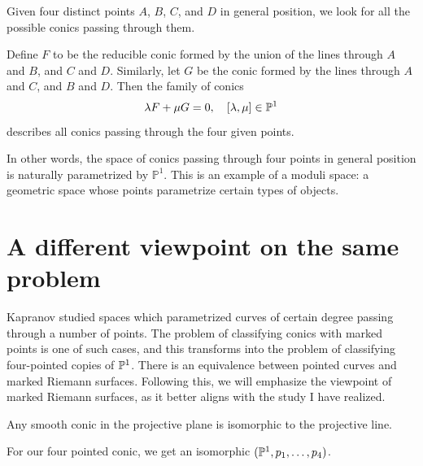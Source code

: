 \documentclass[12pt]{memoir}
\begin{document}
\begin{Ex}
    Given four distinct points $A$, $B$, $C$, and $D$ in general position, we look for all the possible conics passing through them.\par
    Define $F$ to be the reducible conic formed by the union of the lines through $A$ and $B$, and $C$ and $D$. Similarly, let $G$ be the conic formed by the lines through $A$ and $C$, and $B$ and $D$. Then the family of conics
    $$\lambda F+\mu G=0,\quad [\lambda,\mu]\in\mathbb{P}^1$$
    describes all conics passing through the four given points.
\end{Ex}



In other words, the space of conics passing through four points in general position is naturally parametrized by $\mathbb{P}^1$. This is an example of a moduli space: a geometric space whose points parametrize certain types of objects. 

\section{A different viewpoint on the same problem}

Kapranov \cite{KapranovPaper} studied spaces which parametrized curves of certain degree passing through a number of points. The problem of classifying conics with marked points is one of such cases, and this transforms into the problem of classifying four-pointed copies of $\mathbb{P}^1$. There is an equivalence between pointed curves and marked Riemann surfaces. Following this, we will emphasize the viewpoint of marked Riemann surfaces, as it better aligns with the study I have realized. 

\begin{Prop}%
    Any smooth conic in the projective plane is isomorphic to the projective line.
\end{Prop}

For our four pointed conic, we get an isomorphic $(\mathbb{P}^1,p_1,\dots,p_4)$. 
\end{document}
